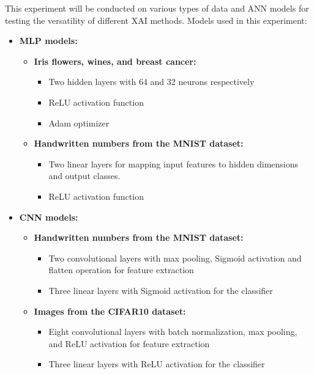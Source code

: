 \documentclass[journal, a4paper]{IEEEtran}
\begin{document}
This experiment will be conducted on various types of data and ANN models for testing the versatility of different XAI methods.
Models used in this experiment:
\begin{itemize}
    \item \textbf{MLP models:}
    \begin{itemize}
        \item \textbf{Iris flowers, wines, and breast cancer:}
        \begin{itemize}
            \item Two hidden layers with 64 and 32 neurons respectively
            \item ReLU activation function
            \item Adam optimizer
        \end{itemize}

        \item \textbf{Handwritten numbers from the MNIST dataset:}
        \begin{itemize}
            \item Two linear layers for mapping input features to hidden dimensions and output classes.
            \item ReLU activation function
        \end{itemize}
    \end{itemize}
    \item \textbf{CNN models:}
    \begin{itemize}
        \item \textbf{Handwritten numbers from the MNIST dataset:}
        \begin{itemize}
            \item Two convolutional layers with max pooling, Sigmoid activation and flatten operation for feature extraction
            \item Three linear layers with Sigmoid activation for the classifier
        \end{itemize}

        \item \textbf{Images from the CIFAR10 dataset:}
        \begin{itemize}
            \item Eight convolutional layers with batch normalization, max pooling, and ReLU activation for feature extraction
            \item Three linear layers with ReLU activation for the classifier
        \end{itemize}
    \end{itemize}

\end{itemize}
\end{document}
